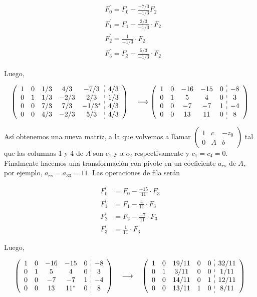 \documentclass[10pt]{article}
\begin{document}
$$
\begin{aligned}
& F_{0}^{\prime}=F_{0}-\frac{-7 / 3}{-1 / 3} F_{2} \\
& F_{1}^{\prime}=F_{1}-\frac{2 / 3}{-1 / 3} \cdot F_{2} \\
& F_{2}^{\prime}=\frac{1}{-1 / 3} \cdot F_{2} \\
& F_{3}^{\prime}=F_{3}-\frac{5 / 3}{-1 / 3} \cdot F_{2}
\end{aligned}
$$

Luego,

$$
\left(\begin{array}{ccccc:c}
1 & 0 & 1 / 3 & 4 / 3 & -7 / 3 & 4 / 3 \\
0 & 1 & 1 / 3 & -2 / 3 & 2 / 3 & 1 / 3 \\
0 & 0 & 7 / 3 & 7 / 3 & -1 / 3^{*} & 4 / 3 \\
0 & 0 & 4 / 3 & -2 / 3 & 5 / 3 & 4 / 3
\end{array}\right) \quad \longrightarrow\left(\begin{array}{ccccc:c}
1 & 0 & -16 & -15 & 0 & -8 \\
0 & 1 & 5 & 4 & 0 & 3 \\
0 & 0 & -7 & -7 & 1 & -4 \\
0 & 0 & 13 & 11 & 0 & 8
\end{array}\right)
$$

Así obtenemos una nueva matriz, a la que volvemos a llamar $\left(\begin{array}{cc|c}1 & c & -z_{0} \\ 0 & A & b\end{array}\right)$ tal que las columnas 1 y 4 de $A$ son $e_{1}$ y a $e_{2}$ respectivamente y $c_{1}=c_{4}=0$. Finalmente hacemos una transformación con pivote en un coeficiente $a_{r s}$ de $A$, por ejemplo, $a_{r s}=a_{33}=11$. Las operaciones de fila serán

$$
\begin{aligned}
F_{0}^{\prime} & =F_{0}-\frac{-15}{11} \cdot F_{3} \\
F_{1}^{\prime} & =F_{1}-\frac{4}{11} \cdot F_{3} \\
F_{2}^{\prime} & =F_{2}-\frac{-7}{11} \cdot F_{3} \\
F_{3}^{\prime} & =\frac{1}{11} \cdot F_{3}
\end{aligned}
$$

Luego,

$$
\left(\begin{array}{ccccc:c}
1 & 0 & -16 & -15 & 0 & -8 \\
0 & 1 & 5 & 4 & 0 & 3 \\
0 & 0 & -7 & -7 & 1 & -4 \\
0 & 0 & 13 & 11^{*} & 0 & 8
\end{array}\right) \quad \longrightarrow \quad\left(\begin{array}{ccccc:c}
1 & 0 & 19 / 11 & 0 & 0 & 32 / 11 \\
0 & 1 & 3 / 11 & 0 & 0 & 1 / 11 \\
0 & 0 & 14 / 11 & 0 & 1 & 12 / 11 \\
0 & 0 & 13 / 11 & 1 & 0 & 8 / 11
\end{array}\right)
$$
\end{document}

